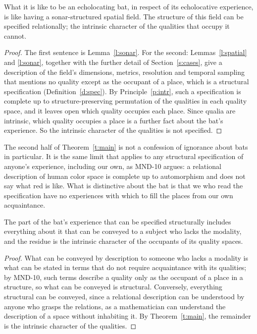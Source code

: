\documentclass{situationist-preprint}
\begin{document}
\begin{theorem}\label{t:main}
What it is like to be an echolocating bat, in respect of its echolocative experience, is like having a sonar-structured spatial field. The structure of this field can be specified relationally; the intrinsic character of the qualities that occupy it cannot.
\end{theorem}

\begin{proof}
The first sentence is Lemma~\ref{l:sonar}. For the second: Lemmas~\ref{l:spatial} and \ref{l:sonar}, together with the further detail of Section~\ref{s:cases}, give a description of the field's dimensions, metrics, resolution and temporal sampling that mentions no quality except as the occupant of a place, which is a structural specification (Definition~\ref{d:spec}). By Principle~\ref{p:intr}, such a specification is complete up to structure-preserving permutation of the qualities in each quality space, and it leaves open which quality occupies each place. Since qualia are intrinsic, which quality occupies a place is a further fact about the bat's experience. So the intrinsic character of the qualities is not specified.
\end{proof}

The second half of Theorem~\ref{t:main} is not a confession of ignorance about bats in particular. It is the same limit that applies to any structural specification of anyone's experience, including our own, as MND-10 argues: a relational description of human color space is complete up to automorphism and does not say what red is like. What is distinctive about the bat is that we who read the specification have no experiences with which to fill the places from our own acquaintance.

\begin{proposition}\label{p:share}
The part of the bat's experience that can be specified structurally includes everything about it that can be conveyed to a subject who lacks the modality, and the residue is the intrinsic character of the occupants of its quality spaces.
\end{proposition}

\begin{proof}
What can be conveyed by description to someone who lacks a modality is what can be stated in terms that do not require acquaintance with its qualities; by MND-10, such terms describe a quality only as the occupant of a place in a structure, so what can be conveyed is structural. Conversely, everything structural can be conveyed, since a relational description can be understood by anyone who grasps the relations, as a mathematician can understand the description of a space without inhabiting it. By Theorem~\ref{t:main}, the remainder is the intrinsic character of the qualities.
\end{proof}
\end{document}
